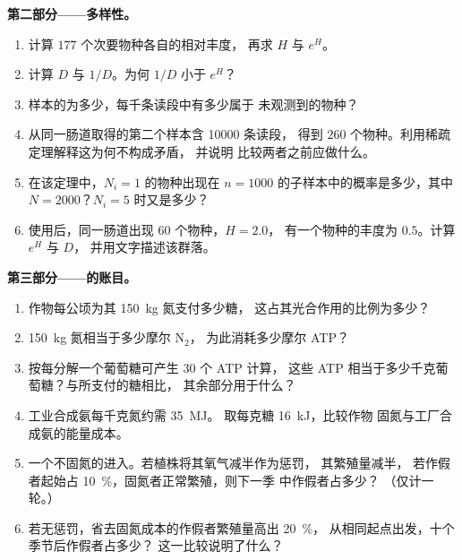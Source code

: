 \begin{problem}
\medskip
\noindent\textbf{第二部分——多样性。}
\begin{enumerate}[resume]
  \item 计算 $177$ 个次要物种各自的相对丰度，
        再求 $H$ 与 $e^{H}$。
  \item 计算 $D$ 与 $1/D$。为何 $1/D$ 小于
        $e^{H}$？
  \item 样本的为多少，每千条读段中有多少属于
        未观测到的物种？
  \item 从同一肠道取得的第二个样本含 \num{10000} 条读段，
        得到 $260$ 个物种。利用稀疏定理解释这为何不构成矛盾，
        并说明
        比较两者之前应做什么。
  \item 在该定理中，$N_{i} = 1$ 的物种出现在
        $n = 1000$ 的子样本中的概率是多少，其中 $N =
        2000$？$N_{i} = 5$ 时又是多少？
  \item 使用后，同一肠道出现 $60$ 个物种，$H = 2.0$，
        有一个物种的丰度为 $0.5$。计算 $e^{H}$ 与 $D$，
        并用文字描述该群落。
\end{enumerate}

\medskip
\noindent\textbf{第三部分——的账目。}
\begin{enumerate}[resume]
  \item 作物每公顷为其
        \qty{150}{kg} 氮支付多少糖，
        这占其光合作用的比例为多少？
  \item \qty{150}{kg} 氮相当于多少摩尔 N$_{2}$，
        为此消耗多少摩尔 ATP？
  \item 按每分解一个葡萄糖可产生 $30$ 个 ATP 计算，
        这些 ATP 相当于多少千克葡萄糖？与所支付的糖相比，
        其余部分用于什么？
  \item 工业合成氨每千克氮约需 \qty{35}{MJ}。
        取每克糖 \qty{16}{kJ}，比较作物
        固氮与工厂合成氨的能量成本。
  \item 一个不固氮的进入。若植株将其氧气减半作为惩罚，
        其繁殖量减半，
        若作假者起始占 \qty{10}{\%}，固氮者正常繁殖，则下一季
        中作假者占多少？
        （仅计一轮。）
  \item 若无惩罚，省去固氮成本的作假者繁殖量高出 \qty{20}{\%}，
        从相同起点出发，十个季节后作假者占多少？
        这一比较说明了什么？
\end{enumerate}


\end{problem}
